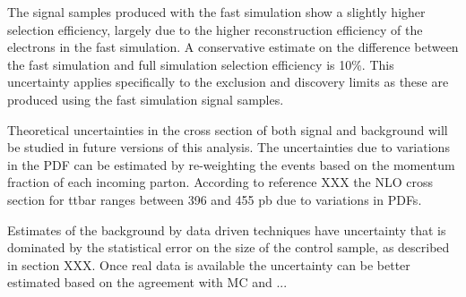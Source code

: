 The signal samples produced with the fast simulation show a slightly higher selection efficiency, largely due to the higher reconstruction efficiency of the 
electrons in the fast simulation.  A conservative estimate on the difference between the fast simulation and full simulation selection efficiency is 10\%.  This uncertainty 
applies specifically to the exclusion and discovery limits as these are produced using the fast simulation signal samples.

Theoretical uncertainties in the cross section of both signal and background will be studied in future versions of this analysis.  The uncertainties due to variations in the 
PDF can be estimated by re-weighting the events based on the momentum fraction of each incoming parton.  According to reference XXX 
the  NLO cross section for ttbar ranges between 396 and 455 pb due to variations in PDFs.  

Estimates of the background by data driven techniques have uncertainty that is dominated by the statistical error on the size of the control sample, 
as described in section XXX.  Once real data is available the uncertainty can be better estimated based on the agreement with MC and ...

% 
